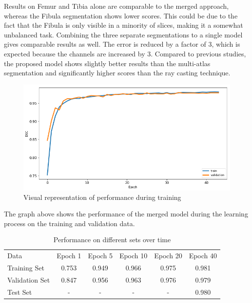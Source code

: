 Results on Femur and Tibia alone are comparable to the merged approach, whereas the Fibula segmentation shows lower scores. This could be due to the fact that the Fibula is only visible in a minority of slices, making it a somewhat unbalanced task. Combining the three separate segmentations to a single model gives comparable results as well. The error is reduced by a factor of 3, which is expected because the channels are increased by 3. Compared to previous studies, the proposed model shows slightly better results than the multi-atlas segmentation and significantly higher scores than the ray casting technique.

\begin{figure}[H]
  \includegraphics[width=\linewidth]{imgs/train_val.png}
\caption{Visual representation of performance during training}
\end{figure}

The graph above shows the performance of the merged model during the learning process on the training and validation data. 

\begin{table}[H]
    \centering
    \begin{tabular}{| l | c | c | c | c | c |}
    \hline
    Data       & Epoch 1 & Epoch 5 & Epoch 10 & Epoch 20 & Epoch 40 \\ 
    \Xhline{3\arrayrulewidth}
    Training Set   & 0.753   & 0.949   & 0.966    & 0.975    & 0.981 \\
    \hline
    Validation Set & 0.847   & 0.956   & 0.963    & 0.976    & 0.979 \\
    \hline
    Test Set       &     -   &     -   &     -    &     -    & 0.980 \\
    \hline
    \end{tabular}
    \caption{Performance on different sets over time}
\end{table}

